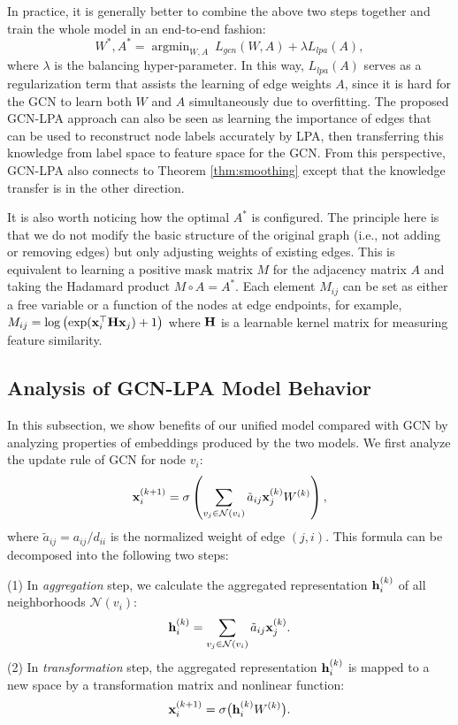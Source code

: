 \documentclass{article}
\begin{document}
		In practice, it is generally better to combine the above two steps together and train the whole model in an end-to-end fashion:
		\begin{equation}
			W^*, A^* = \mathop{\arg\min}_{W, A} \ L_{gcn}(W, A) + \lambda L_{lpa}(A),
		\end{equation}
		where $\lambda$ is the balancing hyper-parameter.
		In this way, $L_{lpa}(A)$ serves as a regularization term that assists the learning of edge weights $A$, since it is hard for the GCN to learn both $W$ and $A$ simultaneously due to overfitting.
		The proposed GCN-LPA approach can also be seen as learning the importance of edges that can be used to reconstruct node labels accurately by LPA, then transferring this knowledge from label space to feature space for the GCN.
		From this perspective, GCN-LPA also connects to Theorem \ref{thm:smoothing} except that the knowledge transfer is in the other direction.
		
		It is also worth noticing how the optimal $A^*$ is configured.
		The principle here is that we do not modify the basic structure of the original graph (i.e., not adding or removing edges) but only adjusting weights of existing edges.
		This is equivalent to learning a positive mask matrix $M$ for the adjacency matrix $A$ and taking the Hadamard product $M \circ A = A^*$.
		Each element $M_{ij}$ can be set as either a free variable or a function of the nodes at edge endpoints, for example, $M_{ij} = \log \left( \exp({\bf x}_i^\top {\bf H} {\bf x}_j) + 1 \right)$ where $\bf H$ is a learnable kernel matrix for measuring feature similarity.
		
	
	\subsection{Analysis of GCN-LPA Model Behavior}
	\label{sec:discussion}
		In this subsection, we show benefits of our unified model compared with GCN by analyzing properties of embeddings produced by the two models.
    	We first analyze the update rule of GCN for node $v_i$:
    	\begin{equation}
    		{\bf x}_i^{(k+1)} = \sigma \left( \sum_{v_j \in \mathcal N(v_i)} \tilde a_{ij} {\bf x}_j^{(k)} W^{(k)} \right), 
    	\end{equation}
    	where $\tilde a_{ij} = a_{ij} / d_{ii}$ is the normalized weight of edge $(j, i)$.
		This formula can be decomposed into the following two steps:
		
		(1) In \textit{aggregation} step, we calculate the aggregated representation ${\bf h}_i^{(k)}$ of all neighborhoods $\mathcal N(v_i)$:
		\begin{equation}
			{\bf h}_i^{(k)} = \sum_{v_j \in \mathcal N(v_i)} \tilde a_{ij} {\bf x}_j^{(k)}.
		\end{equation}
		(2) In \textit{transformation} step, the aggregated representation ${\bf h}_i^{(k)}$ is mapped to a new space by a transformation matrix and nonlinear function:
		\begin{equation}
			{\bf x}_i^{(k+1)} = \sigma \big( {\bf h}_i^{(k)} W^{(k)} \big).
		\end{equation}
		
\end{document}
